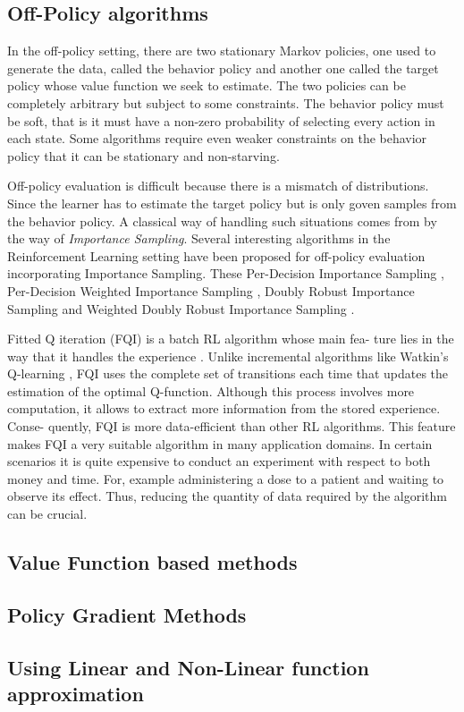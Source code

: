 \subsection{Off-Policy algorithms}
In the off-policy setting, there are two stationary Markov policies, one used
to generate the data, called the behavior policy and another one called the target policy whose value function we seek to estimate. The two policies can be completely arbitrary but subject to some constraints. The behavior policy must be soft, that is it must
have a non-zero probability of selecting every action in
each state. Some algorithms require even weaker constraints on the behavior policy that it can be stationary and non-starving. 

Off-policy evaluation is difficult because there is a mismatch of distributions. Since the learner has to estimate the target policy but is only goven samples from the behavior policy. A classical way of handling such situations comes from \citet{DBLP:books/lib/Rubinstein81} by the way of \textit{Importance Sampling}. Several interesting algorithms in the Reinforcement Learning setting have been proposed for off-policy evaluation incorporating Importance Sampling. These Per-Decision Importance Sampling \citep{DBLP:conf/icml/PrecupSS00}, Per-Decision Weighted Importance Sampling \citep{DBLP:conf/icml/PrecupSS00}, Doubly Robust Importance \citep{DBLP:journals/corr/JiangL15} Sampling and Weighted Doubly Robust Importance Sampling \citep{DBLP:conf/icml/ThomasB16}. 

Fitted Q iteration (FQI) is a batch RL algorithm whose main fea-
ture lies in the way that it handles the experience \citep{DBLP:journals/jmlr/ErnstGW05}. Unlike incremental algorithms like Watkin's Q-learning \citep{DBLP:journals/ml/WatkinsD92}, FQI uses the complete set of transitions each time that updates the estimation of the optimal Q-function. Although this process involves more computation, it allows to extract more information from the stored experience. Conse-
quently, FQI is more data-efficient than other RL algorithms. This feature makes FQI a very suitable algorithm in many application domains. In certain scenarios it is quite expensive to conduct an experiment with respect to both money and time. For, example administering a dose to a patient and waiting to observe its effect. Thus, reducing the quantity of data required by the algorithm can be crucial.

\subsection{Value Function based methods}


\subsection{Policy Gradient Methods}


\subsection{Using Linear and Non-Linear function approximation}